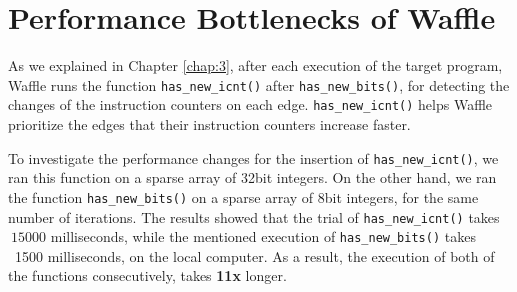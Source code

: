 \section{Performance Bottlenecks of Waffle}
\label{sec:neck}

As we explained in Chapter \ref{chap:3}, after each execution of the target program, Waffle runs the function \texttt{has\_new\_icnt()} after \texttt{has\_new\_bits()}, for detecting the changes of the instruction counters on each edge. \texttt{has\_new\_icnt()} helps Waffle prioritize the edges that their instruction counters increase faster.

To investigate the performance changes for the insertion of \texttt{has\_new\_icnt()}, we ran this function on a sparse array of 32bit integers. On the other hand, we ran the function \texttt{has\_new\_bits()} on a sparse array of 8bit integers, for the same number of iterations. The results showed that the trial of \texttt{has\_new\_icnt()} takes \textbf{$~15000$} milliseconds, while the mentioned execution of \texttt{has\_new\_bits()} takes ~1500 milliseconds, on the local computer. As a result, the execution of both of the functions consecutively, takes \textbf{11x} longer.